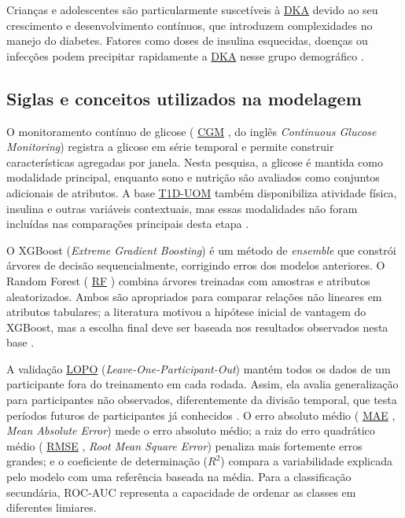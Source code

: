 \documentclass[12pt,a4paper]{article}
\DeclareRobustCommand{\sigla}[1]{%
    \texorpdfstring{\hyperlink{sigla:#1}{#1}}{#1}%
}
\begin{document}
Crianças e adolescentes são particularmente suscetíveis à \sigla{DKA} devido ao seu crescimento e desenvolvimento contínuos, que introduzem complexidades no manejo do diabetes. Fatores como doses de insulina esquecidas, doenças ou infecções podem precipitar rapidamente a \sigla{DKA} nesse grupo demográfico \cite[p. 1,2]{cichosz2025}.

\subsection{Siglas e conceitos utilizados na modelagem}
O monitoramento contínuo de glicose (\sigla{CGM}, do inglês \textit{Continuous Glucose
Monitoring}) registra a glicose em série temporal e permite construir
características agregadas por janela. Nesta pesquisa, a glicose é mantida como
modalidade principal, enquanto sono e nutrição são avaliados como conjuntos
adicionais de atributos. A base \sigla{T1D-UOM} também disponibiliza atividade física,
insulina e outras variáveis contextuais, mas essas modalidades não foram
incluídas nas comparações principais desta etapa
\cite{alsuhaymi2025}.

O XGBoost (\textit{Extreme Gradient Boosting}) é um método de \textit{ensemble}
que constrói árvores de decisão sequencialmente, corrigindo erros dos modelos
anteriores. O Random Forest (\sigla{RF}) combina árvores treinadas com amostras e
atributos aleatorizados. Ambos são apropriados para comparar relações não
lineares em atributos tabulares; a literatura motivou a hipótese inicial de
vantagem do XGBoost, mas a escolha final deve ser baseada nos resultados
observados nesta base \cite{alsamhori2025,cichosz2025}.

A validação \sigla{LOPO} (\textit{Leave-One-Participant-Out}) mantém todos os dados de
um participante fora do treinamento em cada rodada. Assim, ela avalia
generalização para participantes não observados, diferentemente da divisão
temporal, que testa períodos futuros de participantes já conhecidos
\cite{dudukcu2021consolidated}. O erro absoluto médio (\sigla{MAE}, \textit{Mean
Absolute Error}) mede o erro absoluto médio; a raiz do erro quadrático médio
(\sigla{RMSE}, \textit{Root Mean Square Error}) penaliza mais fortemente erros grandes;
e o coeficiente de determinação ($R^2$) compara a variabilidade explicada pelo
modelo com uma referência baseada na média. Para a classificação secundária, ROC-AUC representa a capacidade de ordenar as
classes em diferentes limiares.
\end{document}
